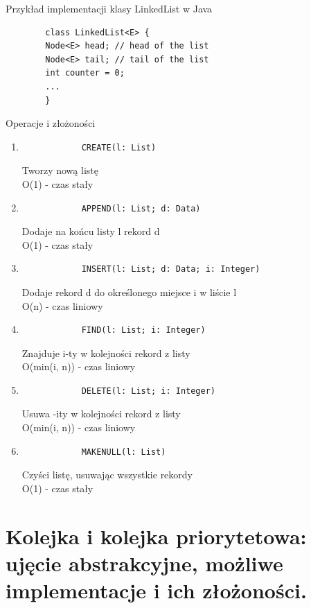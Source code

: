 \documentclass[12pt]{article}
\begin{document}
    Przykład implementacji klasy LinkedList w Java
    \begin{verbatim}
        class LinkedList<E> {
        Node<E> head; // head of the list
        Node<E> tail; // tail of the list
        int counter = 0;
        ...
        }
    \end{verbatim}

    Operacje i złożoności

    \begin{enumerate}
        \item
        \begin{verbatim}
            CREATE(l: List)
        \end{verbatim}
        Tworzy nową listę \\
        O(1) - czas stały
        \item
        \begin{verbatim}
            APPEND(l: List; d: Data)
        \end{verbatim}
        Dodaje na końcu listy l rekord d \\
        O(1) - czas stały
        \item
        \begin{verbatim}
            INSERT(l: List; d: Data; i: Integer)
        \end{verbatim}
        Dodaje rekord d do określonego miejsce i w liście l \\
        O(n) - czas liniowy
        \item
        \begin{verbatim}
            FIND(l: List; i: Integer)
        \end{verbatim}
        Znajduje i-ty w kolejności rekord z listy \\
        O(min(i, n)) - czas liniowy
        \item
        \begin{verbatim}
            DELETE(l: List; i: Integer)
        \end{verbatim}
        Usuwa -ity w kolejności rekord z listy \\
        O(min(i, n)) - czas liniowy
        \item
        \begin{verbatim}
            MAKENULL(l: List)
        \end{verbatim}
        Czyści listę, usuwając wszystkie rekordy \\
        O(1) - czas stały
    \end{enumerate}
    \newpage
    \section{Kolejka i kolejka priorytetowa: ujęcie abstrakcyjne, możliwe implementacje i ich złożoności.}
\end{document}
